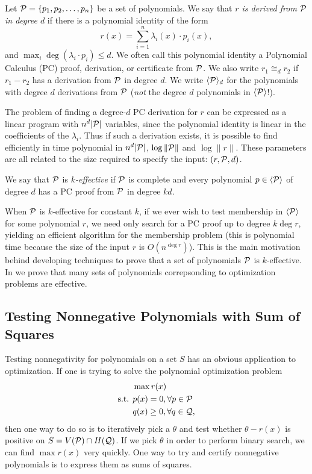 \begin{definition}
Let $\mathcal P = \{p_1, p_2, \dots, p_n\}$ be a set of polynomials. We say that \emph{$r$ is derived from $\mathcal P$ in degree $d$} if there is a polynomial identity of the form
\[r(x) = \sum_{i=1}^n \lambda_i(x) \cdot p_i(x),\]
and $\max_i \deg(\lambda_i \cdot p_i) \leq d$. We often call this polynomial identity a Polynomial Calculus (PC) proof, derivation, or certificate from $\mathcal P$. We also write $r_1 \cong_d r_2$ if $r_1 - r_2$ has a derivation from $\mathcal P$ in degree $d$. We write $\langle \mathcal P \rangle_d$ for the polynomials with degree $d$ derivations from $\mathcal P$ (\emph{not} the degree $d$ polynomials in $\langle \mathcal P \rangle$!).
\end{definition}

The problem of finding a degree-$d$ PC derivation for $r$ can be expressed as a linear program with $n^d|\mathcal P|$ variables, since the polynomial identity is linear in the coefficients of the $\lambda_i$. Thus if such a derivation exists, it is possible to find efficiently in time polynomial in $n^d|\mathcal P|$, $\log \|\mathcal P\|$ and $\log \|r\|$. These parameters are all related to the size required to specify the input: $(r,\mathcal P,d)$.
\begin{definition}
We say that $\mathcal P$ is \emph{$k$-effective} if $\mathcal P$ is complete and every polynomial $p \in \langle \mathcal P \rangle$ of degree $d$ has a PC proof from $\mathcal P$ in degree $kd$.
\end{definition}
When $\mathcal P$ is $k$-effective for constant $k$, if we ever wish to test membership in $\langle \mathcal P \rangle$ for some polynomial $r$, we need only search for a PC proof up to degree $k \deg r$, yielding an efficient algorithm for the membership problem (this is polynomial time because the size of the input $r$ is $O(n^{\deg r})$). This is the main motivation behind developing techniques to prove that a set of polynomials $\mathcal P$ is $k$-effective. In  we prove that many sets of polynomials correpsonding to optimization problems are effective.

\subsection{Testing Nonnegative Polynomials with Sum of Squares}

Testing nonnegativity for polynomials on a set $S$ has an obvious application to optimization. If one is trying to solve the polynomial optimization problem
\begin{align*}
&\max r(x) \\
\text{s.t. } &p(x) = 0, \forall p \in \mathcal P \\
&q(x) \geq 0, \forall q \in \mathcal Q,
\end{align*}
then one way to do so is to iteratively pick a $\theta$ and test whether $\theta - r(x)$ is positive on $S = V(\mathcal P) \cap H(\mathcal Q)$.
If we pick $\theta$ in order to perform binary search, we can find $\max r(x)$ very quickly. One way to try and certify nonnegative polynomials is to express them as sums of squares.

